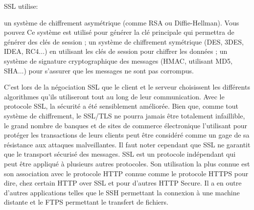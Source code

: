 SSL utilise:
\begin{itemize}
	\itemcheck un système de chiffrement asymétrique (comme RSA ou Diffie-Hellman). Vous pouvez Ce système est utilisé pour générer la clé principale qui permettra de générer des clés de session ;
	\itemcheck un système de chiffrement symétrique (DES, 3DES, IDEA, RC4...) en utilisant les clés de session pour chiffrer les données ;
	\itemcheck un système de signature cryptographique des messages (HMAC, utilisant MD5, SHA...) pour s'assurer que les messages ne sont pas corrompus.
\end{itemize}
C'est lors de la négociation SSL que le client et le serveur choisissent les différents algorithmes qu’ils utiliseront tout au long de leur communication.
Avec le protocole SSL, la sécurité a été sensiblement améliorée. Bien que, comme tout système de chiffrement, le SSL/TLS ne pourra jamais être totalement infaillible, le grand nombre de banques et de sites de commerce électronique l'utilisant pour protéger les transactions de leurs clients peut être considéré comme un gage de sa résistance aux attaques malveillantes. Il faut noter cependant que SSL ne garantit que le transport sécurisé des messages.
SSL est un protocole indépendant qui peut être appliqué à plusieurs autres protocoles. Son utilisation la plus connue est son association avec le protocole HTTP connue comme le protocole HTTPS pour dire, chez certain HTTP over SSL et pour d’autres HTTP Secure. Il a en outre d’autres applications telles que le SSH permettant la connexion à une machine distante et le FTPS permettant le transfert de fichiers.

